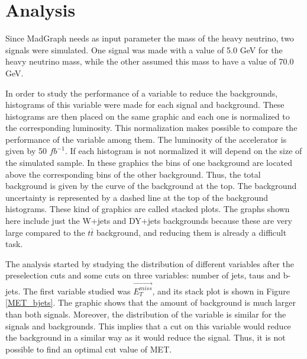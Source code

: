 \chapter{Analysis}
\label{Analysis_chapter}

Since MadGraph needs as input parameter the mass of the heavy neutrino, two signals were simulated. One signal was made with a value of 5.0 GeV for the heavy neutrino mass, while the other assumed 
this mass to have a value of 70.0 GeV. 

In order to study the performance of a variable to reduce the backgrounds, histograms of this variable were made for each signal and background. These histograms are then placed on the same graphic 
and each one is normalized to the corresponding luminosity. This normalization makes possible to compare the performance of the variable among them. The luminosity of the accelerator is given by 50 $fb^{-1}$. If 
each histogram is not normalized it will depend on the size of the simulated sample. In these graphics the bins of one background are located above the corresponding bins of the other background. 
Thus, the total background is given by the curve of the background at the top. The background uncertainty is represented by a dashed line at the top of the background histograms. These kind of 
graphics are called stacked plots. The graphs shown here include just the W+jets and DY+jets backgrounds because these are very large compared to the 
$t\overline{t}$ background, and reducing them is already a difficult task.

The analysis started by studying the distribution of different variables after the preselection cuts and some cuts on three variables: number of jets, taus and b-jets. The first variable studied 
was $\vec{E_T^{miss}}$, and its stack plot is shown in Figure \ref{MET_bjets}. The graphic shows that the amount of background is much larger than both signals. Moreover, the distribution of the 
variable is similar for the signals and backgrounds. This implies that a cut on this variable would reduce the background in a similar way as it would reduce the signal. Thus, it is not possible 
to find an optimal cut value of MET.


